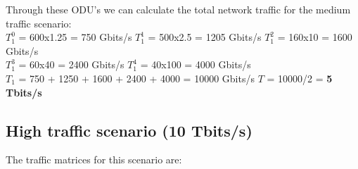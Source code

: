 \vspace{17pt}
Through these ODU's we can calculate the total network traffic for the medium traffic scenario:\\

$T_1^0$ = 600x1.25 = 750 Gbits/s \quad
$T_1^1$ = 500x2.5 = 1205 Gbits/s \quad
$T_1^2$ = 160x10 = 1600 Gbits/s \\

$T_1^3$ = 60x40 = 2400 Gbits/s \quad
$T_1^4$ = 40x100 = 4000 Gbits/s \\

$T_{1}$ = 750 + 1250 + 1600 + 2400 + 4000 = 10000 Gbits/s \qquad
$T$ = 10000/2 = \textbf{5 Tbits/s}\\

\subsection{High traffic scenario (10 Tbits/s)}\label{high_traffic_scenario}

The traffic matrices for this scenario are:

